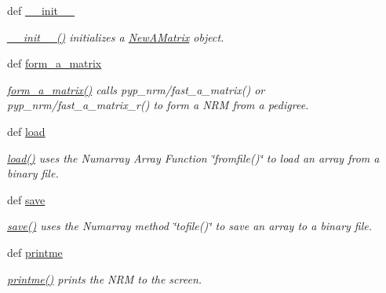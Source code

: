 \begin{DoxyCompactItemize}
\item 
def \hyperlink{classPyPedal_1_1pyp__newclasses_1_1NewAMatrix_a38f78e043e7bee1cac6237a09d912d93}{\_\-\_\-init\_\-\_\-}
\begin{DoxyCompactList}\small\item\em \hyperlink{classPyPedal_1_1pyp__newclasses_1_1NewAMatrix_a38f78e043e7bee1cac6237a09d912d93}{\_\-\_\-init\_\-\_\-()} initializes a \hyperlink{classPyPedal_1_1pyp__newclasses_1_1NewAMatrix}{NewAMatrix} object. \end{DoxyCompactList}\item 
def \hyperlink{classPyPedal_1_1pyp__newclasses_1_1NewAMatrix_aab22e9d4b42f4207692435849e15a551}{form\_\-a\_\-matrix}
\begin{DoxyCompactList}\small\item\em \hyperlink{classPyPedal_1_1pyp__newclasses_1_1NewAMatrix_aab22e9d4b42f4207692435849e15a551}{form\_\-a\_\-matrix()} calls pyp\_\-nrm/fast\_\-a\_\-matrix() or pyp\_\-nrm/fast\_\-a\_\-matrix\_\-r() to form a NRM from a pedigree. \end{DoxyCompactList}\item 
def \hyperlink{classPyPedal_1_1pyp__newclasses_1_1NewAMatrix_a1d5ee9920957680eb210fe4b1b81adb3}{load}
\begin{DoxyCompactList}\small\item\em \hyperlink{classPyPedal_1_1pyp__newclasses_1_1NewAMatrix_a1d5ee9920957680eb210fe4b1b81adb3}{load()} uses the Numarray Array Function \char`\"{}fromfile()\char`\"{} to load an array from a binary file. \end{DoxyCompactList}\item 
def \hyperlink{classPyPedal_1_1pyp__newclasses_1_1NewAMatrix_ac2ee373f5e250c7ae637dc983f1b1651}{save}
\begin{DoxyCompactList}\small\item\em \hyperlink{classPyPedal_1_1pyp__newclasses_1_1NewAMatrix_ac2ee373f5e250c7ae637dc983f1b1651}{save()} uses the Numarray method \char`\"{}tofile()\char`\"{} to save an array to a binary file. \end{DoxyCompactList}\item 
def \hyperlink{classPyPedal_1_1pyp__newclasses_1_1NewAMatrix_a65c238459dd58cb32ec19cb7c93164ba}{printme}
\begin{DoxyCompactList}\small\item\em \hyperlink{classPyPedal_1_1pyp__newclasses_1_1NewAMatrix_a65c238459dd58cb32ec19cb7c93164ba}{printme()} prints the NRM to the screen. \end{DoxyCompactList}\end{DoxyCompactItemize}
